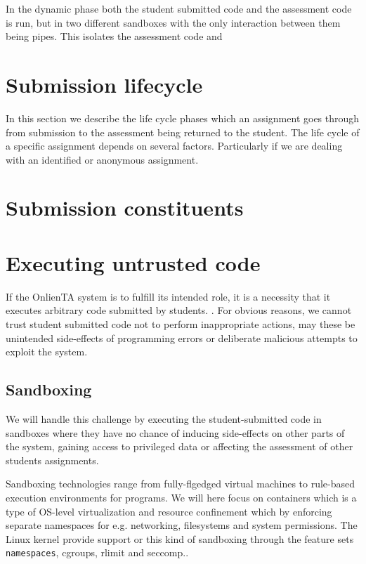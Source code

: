 In the dynamic phase both the student submitted code and the
assessment code is run, but in two different sandboxes with the only
interaction between them being pipes. This isolates the assessment
code and 


\section{Submission lifecycle}
In this section we describe the life cycle phases which an assignment
goes through from submission to the assessment being returned to the
student. The life cycle of a specific assignment depends on several
factors. Particularly if we are dealing with an identified or
anonymous assignment.


\section{Submission constituents}


\section{Executing untrusted code}
If the OnlienTA system is to fulfill its intended role, it is a
necessity that it executes arbitrary code submitted by
students. . For obvious reasons, we cannot trust
student submitted code not to perform inappropriate actions, may these
be unintended side-effects of programming errors or deliberate
malicious attempts to exploit the system.


\subsection{Sandboxing}
We will handle this challenge by executing the student-submitted code
in sandboxes where they have no chance of inducing side-effects on
other parts of the system, gaining access to privileged data or
affecting the assessment of other students assignments.


Sandboxing technologies range from fully-flgedged virtual machines to
rule-based execution environments for programs. We will here focus on
containers which is a type of OS-level virtualization and resource
confinement which  by enforcing separate
namespaces for e.g. networking, filesystems and system
permissions. The Linux kernel provide support or this kind of
sandboxing through the feature sets
\texttt{namespaces}\cite{namespaces}, cgroups, rlimit and seccomp..


